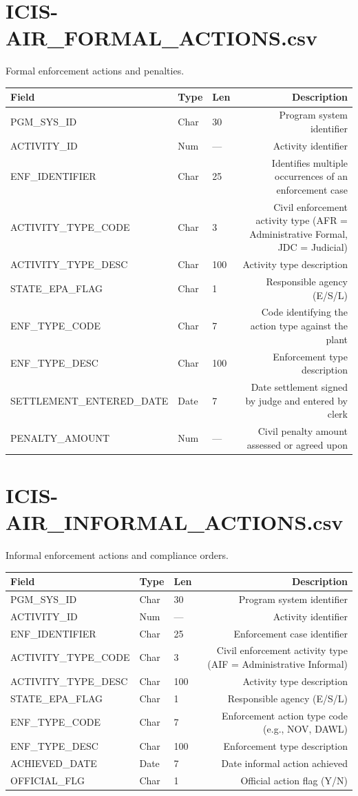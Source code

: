 \documentclass[11pt]{article}
\begin{document}
\section*{ICIS-AIR\_FORMAL\_ACTIONS.csv}
Formal enforcement actions and penalties.
\begin{longtable}{F T L D}
\toprule
Field & Type & Len & Description \\ \midrule \endhead
PGM\_SYS\_ID & Char & 30 & Program system identifier \\
ACTIVITY\_ID & Num & --- & Activity identifier \\
ENF\_IDENTIFIER & Char & 25 & Identifies multiple occurrences of an enforcement case \\
ACTIVITY\_TYPE\_CODE & Char & 3 & Civil enforcement activity type (AFR = Administrative Formal, JDC = Judicial) \\
ACTIVITY\_TYPE\_DESC & Char & 100 & Activity type description \\
STATE\_EPA\_FLAG & Char & 1 & Responsible agency (E/S/L) \\
ENF\_TYPE\_CODE & Char & 7 & Code identifying the action type against the plant \\
ENF\_TYPE\_DESC & Char & 100 & Enforcement type description \\
SETTLEMENT\_ENTERED\_DATE & Date & 7 & Date settlement signed by judge and entered by clerk \\
PENALTY\_AMOUNT & Num & --- & Civil penalty amount assessed or agreed upon \\
\bottomrule
\end{longtable}

\section*{ICIS-AIR\_INFORMAL\_ACTIONS.csv}
Informal enforcement actions and compliance orders.
\begin{longtable}{F T L D}
\toprule
Field & Type & Len & Description \\ \midrule \endhead
PGM\_SYS\_ID & Char & 30 & Program system identifier \\
ACTIVITY\_ID & Num & --- & Activity identifier \\
ENF\_IDENTIFIER & Char & 25 & Enforcement case identifier \\
ACTIVITY\_TYPE\_CODE & Char & 3 & Civil enforcement activity type (AIF = Administrative Informal) \\
ACTIVITY\_TYPE\_DESC & Char & 100 & Activity type description \\
STATE\_EPA\_FLAG & Char & 1 & Responsible agency (E/S/L) \\
ENF\_TYPE\_CODE & Char & 7 & Enforcement action type code (e.g., NOV, DAWL) \\
ENF\_TYPE\_DESC & Char & 100 & Enforcement type description \\
ACHIEVED\_DATE & Date & 7 & Date informal action achieved \\
OFFICIAL\_FLG & Char & 1 & Official action flag (Y/N) \\
\bottomrule
\end{longtable}
\end{document}
